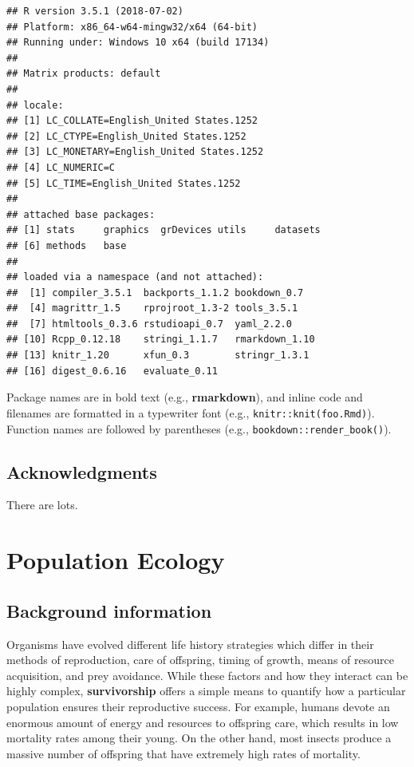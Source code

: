 \documentclass[]{book}
\theoremstyle{definition}
\theoremstyle{definition}
\theoremstyle{definition}
\theoremstyle{remark}
\begin{document}
\begin{verbatim}
## R version 3.5.1 (2018-07-02)
## Platform: x86_64-w64-mingw32/x64 (64-bit)
## Running under: Windows 10 x64 (build 17134)
## 
## Matrix products: default
## 
## locale:
## [1] LC_COLLATE=English_United States.1252 
## [2] LC_CTYPE=English_United States.1252   
## [3] LC_MONETARY=English_United States.1252
## [4] LC_NUMERIC=C                          
## [5] LC_TIME=English_United States.1252    
## 
## attached base packages:
## [1] stats     graphics  grDevices utils     datasets 
## [6] methods   base     
## 
## loaded via a namespace (and not attached):
##  [1] compiler_3.5.1  backports_1.1.2 bookdown_0.7   
##  [4] magrittr_1.5    rprojroot_1.3-2 tools_3.5.1    
##  [7] htmltools_0.3.6 rstudioapi_0.7  yaml_2.2.0     
## [10] Rcpp_0.12.18    stringi_1.1.7   rmarkdown_1.10 
## [13] knitr_1.20      xfun_0.3        stringr_1.3.1  
## [16] digest_0.6.16   evaluate_0.11
\end{verbatim}

Package names are in bold text (e.g., \textbf{rmarkdown}), and inline
code and filenames are formatted in a typewriter font (e.g.,
\texttt{knitr::knit(\textquotesingle{}foo.Rmd\textquotesingle{})}).
Function names are followed by parentheses (e.g.,
\texttt{bookdown::render\_book()}).

\section*{Acknowledgments}\label{acknowledgments}


There are lots.

\mainmatter

\chapter{Population Ecology}\label{population}

\section{Background information}\label{background-information}

Organisms have evolved different life history strategies which differ in
their methods of reproduction, care of offspring, timing of growth,
means of resource acquisition, and prey avoidance. While these factors
and how they interact can be highly complex, \textbf{survivorship}
offers a simple means to quantify how a particular population ensures
their reproductive success. For example, humans devote an enormous
amount of energy and resources to offspring care, which results in low
mortality rates among their young. On the other hand, most insects
produce a massive number of offspring that have extremely high rates of
mortality.
\end{document}

